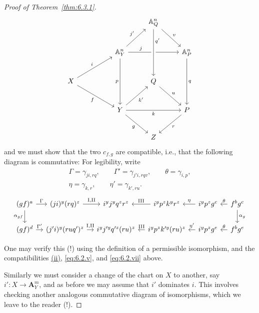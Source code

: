 \begin{proof}[Proof of Theorem~\ref{thm:6.3.1}]
\[\begin{tikzcd}[row sep=2.5em, column sep=2.5em]
	& & & \mathbb{A}^n_Q \arrow[rd, "v"] & \\
	& & \mathbb{A}^n_Y \arrow[ru, "j'"] \arrow[rr, "j" near start] \arrow[dd, "p"'] & & \mathbb{A}^n_P \arrow[dd, "q"] \\
	X \arrow[rru, "i"] \arrow[rrd, "f"'] & & & Q \arrow[rd, "u"] & \\
	& & Y \arrow[ru, "k'"'] \arrow[rr, "k"'] \arrow[rd, "g"'] & & P \arrow[ld, "r"] \\
	& & & Z &
	\arrow[from=1-4, to=3-4, "q'" near start, crossing over]
\end{tikzcd}\]
and we must show that the two $c_{f,g}$ are compatible, i.e., that the following diagram is commutative:
For legibility, write
\[
\begin{gathered}
\Gamma=\gamma_{ji,rq},\qquad \Gamma'=\gamma_{j'i,rqv},\qquad
\theta=\gamma_{i,p},\\
\eta=\gamma_{k,r},\qquad \eta'=\gamma_{k',ru}.
\end{gathered}
\]
\[\begin{tikzcd}[column sep=1em]
	(gf)^a \arrow[r, "\Gamma"] \arrow[d, "\alpha_{gf}"'] & (ji)^y(rq)^z \arrow[r, "\mathrm{I,II}"] & i^y j^y q^z r^z & i^y p^z k^y r^z \arrow[l, "\mathrm{III}"'] & i^y p^z g^c \arrow[l, "\eta"'] & f^b g^c \arrow[l, "\theta"'] \arrow[d, "\alpha_{g}"] \\
	(gf)^d \arrow[r, "\Gamma'"] & (j'i)^y(ruq')^z \arrow[r, "\mathrm{I,II}"] & i^y j'^y q'^z (ru)^z & i^y p^z k'^y (ru)^z \arrow[l, "\mathrm{III}"'] & i^y p^z g^e \arrow[l, "\eta'"'] & f^b g^e \arrow[l, "\theta"']
\end{tikzcd}\]

One may verify this (!) using the definition of a permissible isomorphism, and the compatibilities \hyperref[compat:6.2.ii]{(ii)}, \eqref{eq:6.2.v}, and \eqref{eq:6.2.vii} above.

Similarly we must consider a change of the chart on $X$ to another, say $i'\colon X\to\mathbf{A}_Y^{m}$, and as before we may assume that $i'$ dominates $i$. This involves checking another analogous commutative diagram of isomorphisms, which we leave to the reader (!).

\par\endgroup


\end{proof}
